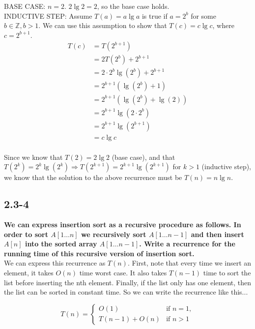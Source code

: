 \documentclass[11pt]{article}
\begin{document}
 BASE CASE: $n = 2$.  $2 \lg 2 = 2$, so the base case holds. \\

 INDUCTIVE STEP: Assume $T(a) = a \lg a$ is true if $a = 2^b$ for some $b \in \mathbb{Z}, b > 1$. 
 We can use this assumption to show that $T(c) = c \lg c$, where $c = 2^{b+1}$.
 \begin{align*}
   && T(c) &= T(2^{b+1}) && \\
   && &= 2T(2^b) + 2^{b+1} && \\
   && &= 2 \cdot 2^b \lg (2^b) + 2^{b+1} && \\
   && &= 2^{b+1}(\lg(2^b) + 1) && \\
   && &= 2^{b+1}(\lg(2^b) + \lg(2)) && \\
   && &= 2^{b+1}\lg(2 \cdot 2^b) && \\
   && &= 2^{b+1}\lg(2^{b+1}) && \\
   && &= c \lg c && \\
 \end{align*}

 Since we know that $T(2) = 2 \lg 2$ (base case), and that $T(2^k) = 2^k \lg (2^k) \Rightarrow
 T(2^{k+1}) = 2^{k+1} \lg (2^{k+1})$ for $k > 1$ (inductive step), we know that the solution 
 to the above recurrence must be $T(n) = n \lg n$. \newpage

 \subsection*{2.3-4}
 \textbf{We can express insertion sort as a recursive procedure as follows. In order to sort 
 $A[1 \ldots n]$ we recursively sort $A[1 \ldots n-1]$ and then insert $A[n]$ into the sorted array 
 $A[1 \ldots n-1]$. Write a recurrence for the running time of this recursive version of insertion 
 sort.} \\

 We can express this recurrence as $T(n)$.  First, note that every time we insert an element, it takes 
 $O(n)$ time worst case.  It also takes $T(n-1)$ time to sort the list before inserting the nth element.
 Finally, if the list only has one element, then the list can be sorted in constant time.
 So we can write the recurrence like this...

 \[
   T(n) = 
   \begin{cases}
     O(1) & \text{if } n = 1, \\
     T(n-1) + O(n) & \text{if } n > 1
   \end{cases}
 \]
\end{document}
